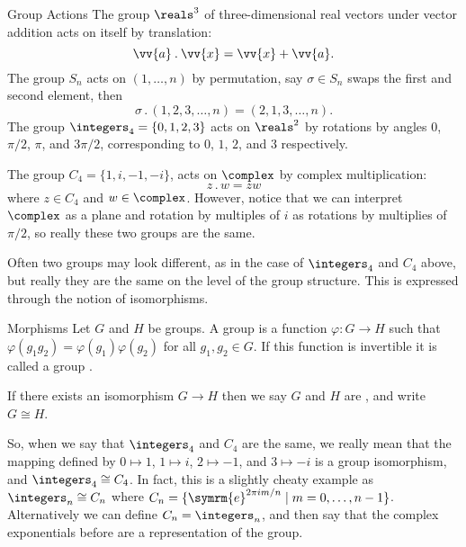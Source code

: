\documentclass[fleqn]{NotesClass}
\newcommand{\cyclicGroupZ}[1][n]{\integers_{#1}}
\newcommand{\cyclicGroupC}[1][n]{C_{#1}}
\newcommand{\action}{\mathbin{.}}
\newcommand{\e}{\symrm{e}}
\newcommand{\isomorphic}{\cong}
\begin{document}
    \begin{exm}{Group Actions}{}
        The group \(\reals^3\) of three-dimensional real vectors under vector addition acts on itself by translation:
        \begin{equation}
            \vv{a} \action \vv{x} = \vv{x} + \vv{a}.
        \end{equation}
        The group \(S_n\) acts on \((1, \dotsc, n)\) by permutation, say \(\sigma \in S_n\) swaps the first and second element, then
        \begin{equation}
            \sigma \action (1, 2, 3, \dotsc, n) = (2, 1, 3, \dotsc, n).
        \end{equation}
        The group \(\cyclicGroupZ[4] = \{0, 1, 2, 3\}\) acts on \(\reals^2\) by rotations by angles \(0\), \(\pi/2\), \(\pi\), and \(3\pi/2\), corresponding to \(0\), \(1\), \(2\), and \(3\) respectively.
        
        The group \(\cyclicGroupC[4] = \{1, i, -1, -i\}\), acts on \(\complex\) by complex multiplication:
        \begin{equation}
            z \action w = zw
        \end{equation}
        where \(z \in \cyclicGroupC[4]\) and \(w \in \complex\).
        However, notice that we can interpret \(\complex\) as a plane and rotation by multiples of \(i\) as rotations by multiplies of \(\pi/2\), so really these two groups are the same.
    \end{exm}

    Often two groups may look different, as in the case of \(\cyclicGroupZ[4]\) and \(\cyclicGroupC[4]\) above, but really they are the same on the level of the group structure.
    This is expressed through the notion of isomorphisms.
    
    \begin{dfn}{Morphisms}{}
        Let \(G\) and \(H\) be groups.
        A group  is a function \(\varphi \colon G \to H\) such that \(\varphi(g_1 g_2) = \varphi(g_1)\varphi(g_2)\) for all \(g_1, g_2 \in G\).
        If this function is invertible it is called a group .
        
        If there exists an isomorphism \(G \to H\) then we say \(G\) and \(H\) are , and write \(G \isomorphic H\).
    \end{dfn}
    
    So, when we say that \(\cyclicGroupZ[4]\) and \(\cyclicGroupC[4]\) are the same, we really mean that the mapping defined by \(0 \mapsto 1\), \(1 \mapsto i\), \(2 \mapsto -1\), and \(3 \mapsto -i\) is a group isomorphism, and \(\cyclicGroupZ[4] \isomorphic \cyclicGroupC[4]\).
    In fact, this is a slightly cheaty example as \(\cyclicGroupZ[n] \isomorphic \cyclicGroupC[n]\) where \(\cyclicGroupC[n] = \{\e^{2\pi i m/n} \mid m = 0, \dotsc, n - 1\}\).
    Alternatively we can define \(\cyclicGroupC[n] = \cyclicGroupZ[n]\), and then say that the complex exponentials before are a representation of the group.
    
\end{document}
